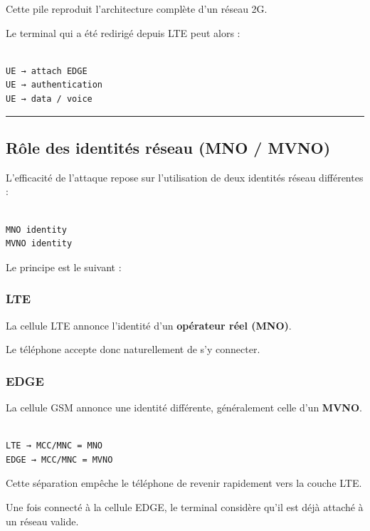 \documentclass[
  french,
]{article}
\begin{document}
Cette pile reproduit l'architecture complète d'un réseau 2G.

Le terminal qui a été redirigé depuis LTE peut alors :

\begin{verbatim}

UE → attach EDGE
UE → authentication
UE → data / voice
\end{verbatim}

\begin{center}\rule{0.5\linewidth}{0.5pt}\end{center}

\subsection{Rôle des identités réseau (MNO /
MVNO)}\label{ruxf4le-des-identituxe9s-ruxe9seau-mno-mvno}

L'efficacité de l'attaque repose sur l'utilisation de deux identités
réseau différentes :

\begin{verbatim}

MNO identity
MVNO identity
\end{verbatim}

Le principe est le suivant :

\subsubsection{LTE}\label{lte}

La cellule LTE annonce l'identité d'un \textbf{opérateur réel (MNO)}.

Le téléphone accepte donc naturellement de s'y connecter.

\subsubsection{EDGE}\label{edge}

La cellule GSM annonce une identité différente, généralement celle d'un
\textbf{MVNO}.

\begin{verbatim}

LTE → MCC/MNC = MNO
EDGE → MCC/MNC = MVNO
\end{verbatim}

Cette séparation empêche le téléphone de revenir rapidement vers la
couche LTE.

Une fois connecté à la cellule EDGE, le terminal considère qu'il est
déjà attaché à un réseau valide.
\end{document}
